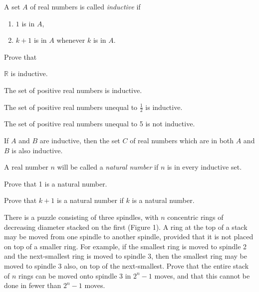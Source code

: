 \begin{letters}
\item A set $A$ of real numbers is called \emph{inductive} if
\begin{enumerate}[label=(\arabic*),leftmargin=2.6em,itemsep=0pt,topsep=2pt]
\item $1$ is in $A$,
\item $k+1$ is in $A$ whenever $k$ is in $A$.
\end{enumerate}
Prove that
\begin{romans}
\item $\mathbb{R}$ is inductive.
\item The set of positive real numbers is inductive.
\item The set of positive real numbers unequal to $\tfrac{1}{2}$ is inductive.
\item The set of positive real numbers unequal to 5 is not inductive.
\item If $A$ and $B$ are inductive, then the set $C$ of real numbers which
  are in both $A$ and $B$ is also inductive.
\end{romans}
\item A real number $n$ will be called a \emph{natural number} if $n$ is in
  every inductive set.
\begin{romans}
\item Prove that 1 is a natural number.
\item Prove that $k+1$ is a natural number if $k$ is a natural number.
\end{romans}
\end{letters}

 There is a puzzle consisting of three spindles, with $n$ concentric
rings of decreasing diameter stacked on the first (Figure 1). A ring at the
top of a stack may be moved from one spindle to another spindle, provided
that it is not placed on top of a smaller ring. For example, if the smallest
ring is moved to spindle 2 and the next-smallest ring is moved to spindle 3,
then the smallest ring may be moved to spindle 3 also, on top of the
next-smallest. Prove that the entire stack of $n$ rings can be moved onto
spindle 3 in $2^n - 1$ moves, and that this cannot be done in fewer than
$2^n - 1$ moves.

\begin{center}

\end{center}

